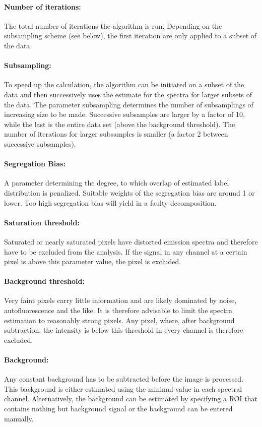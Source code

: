 \documentclass{article}
\begin{document}
\paragraph{Number of iterations:} 
The total number of iterations the algorithm is run. Depending on the
subsampling scheme (see below), the first iteration are only applied to a
subset of the data. 
\paragraph{Subsampling:}To speed up the calculation, the algorithm can be
initiated on a subset of the data and then successively uses the estimate for
the spectra for larger subsets of the data. The parameter subsampling
determines the number of subsamplings of increasing size to be made. Successive
subsamples are larger by a factor of 10, while the last is the entire data set
(above the background threshold). The number of iterations for larger subsamples
is smaller (a factor 2 between successive subsamples).
\paragraph{Segregation Bias: } A parameter determining the degree,
to which overlap of estimated label distribution is penalized. Suitable weights
of the segregation bias are around 1 or lower. Too high segregation bias will
yield in a faulty decomposition.
\paragraph{Saturation threshold:}Saturated or nearly saturated pixels have
distorted emission spectra and therefore have to be excluded from the
analysis. If the signal in any channel at a certain pixel is above this
parameter value, the pixel is excluded. 
\paragraph{Background threshold:}Very faint pixels carry little information
and are likely dominated by noise, autofluorescence and the like. It is
therefore advisable to limit the spectra estimation to reasonably strong
pixels. Any pixel, where, after background subtraction, the intensity is below
this threshold in every channel is therefore excluded. 
\paragraph{Background:}Any constant background has to be subtracted before the
image is processed. This background is either estimated using the minimal value
in each spectral channel. Alternatively, the background can be estimated by
specifying a ROI that contains nothing but background signal or the background
can be entered manually.
\end{document}

